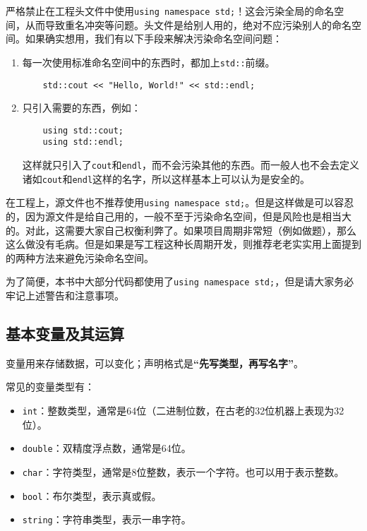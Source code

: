 \begin{warning}
    严格禁止在工程头文件中使用\texttt{using namespace std;}！这会污染全局的命名空间，从而导致重名冲突等问题。头文件是给别人用的，绝对不应污染别人的命名空间。如果确实想用，我们有以下手段来解决污染命名空间问题：
    
    \begin{enumerate}
        \item 每一次使用标准命名空间中的东西时，都加上\texttt{std::}前缀。
        \begin{lstlisting}
    std::cout << "Hello, World!" << std::endl;
        \end{lstlisting}
        \item 只引入需要的东西，例如：
        \begin{lstlisting}
    using std::cout;
    using std::endl;
        \end{lstlisting}
        这样就只引入了\texttt{cout}和\texttt{endl}，而不会污染其他的东西。而一般人也不会去定义诸如\texttt{cout}和\texttt{endl}这样的名字，所以这样基本上可以认为是安全的。
    \end{enumerate}
\end{warning}

\begin{caution}
    在工程上，源文件也不推荐使用\texttt{using namespace std;}。但是这样做是可以容忍的，因为源文件是给自己用的，一般不至于污染命名空间，但是风险也是相当大的。对此，这需要大家自己权衡利弊了。如果项目周期非常短（例如做题），那么这么做没有毛病。但是如果是写工程这种长周期开发，则推荐老老实实用上面提到的两种方法来避免污染命名空间。
\end{caution}

\begin{note}
    为了简便，本书中大部分代码都使用了\texttt{using namespace std;}，但是请大家务必牢记上述警告和注意事项。
\end{note}

\subsection{基本变量及其运算}

变量用来存储数据，可以变化；声明格式是\textbf{“先写类型，再写名字”}。

常见的变量类型有：
\begin{itemize}
  \item \texttt{int}：整数类型，通常是64位（二进制位数，在古老的32位机器上表现为32位）。
  \item \texttt{double}：双精度浮点数，通常是64位。
  \item \texttt{char}：字符类型，通常是8位整数，表示一个字符。也可以用于表示整数。
  \item \texttt{bool}：布尔类型，表示真或假。
  \item \texttt{string}：字符串类型，表示一串字符。
\end{itemize}

